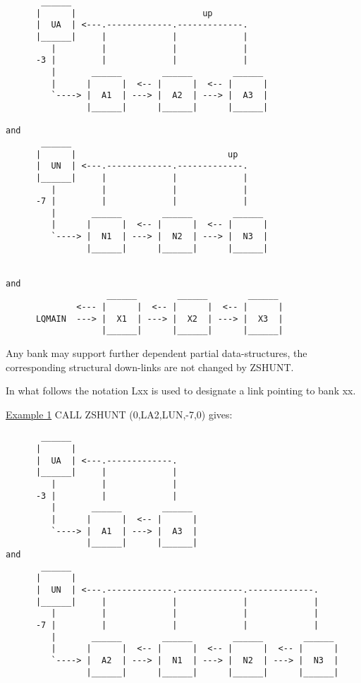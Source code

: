 \begin{verbatim}
       ______
      |      |                         up
      |  UA  | <---.-------------.-------------.
      |______|     |             |             |
         |         |             |             |
      -3 |         |             |             |
         |       ______        ______        ______
         |      |      |  <-- |      |  <-- |      |
         `----> |  A1  | ---> |  A2  | ---> |  A3  |
                |______|      |______|      |______|

and
       ______
      |      |                              up
      |  UN  | <---.-------------.-------------.
      |______|     |             |             |
         |         |             |             |
      -7 |         |             |             |
         |       ______        ______        ______
         |      |      |  <-- |      |  <-- |      |
         `----> |  N1  | ---> |  N2  | ---> |  N3  |
                |______|      |______|      |______|


and
                    ______        ______        ______
              <--- |      |  <-- |      |  <-- |      |
      LQMAIN  ---> |  X1  | ---> |  X2  | ---> |  X3  |
                   |______|      |______|      |______|
\end{verbatim} 
Any bank may support further dependent partial data-structures,
the corresponding structural down-links are not changed
by ZSHUNT.

In what follows the notation  Lxx  is used to designate
a link pointing to bank xx.

\ul{Example 1} \hspace{12mm} CALL ZSHUNT (0,LA2,LUN,-7,0)   \hspace{5mm} gives:
\begin{verbatim}
       ______
      |      |
      |  UA  | <---.-------------.
      |______|     |             |
         |         |             |
      -3 |         |             |
         |       ______        ______
         |      |      |  <-- |      |
         `----> |  A1  | ---> |  A3  |
                |______|      |______|
and
       ______
      |      |
      |  UN  | <---.-------------.-------------.-------------.
      |______|     |             |             |             |
         |         |             |             |             |
      -7 |         |             |             |             |
         |       ______        ______        ______        ______
         |      |      |  <-- |      |  <-- |      |  <-- |      |
         `----> |  A2  | ---> |  N1  | ---> |  N2  | ---> |  N3  |
                |______|      |______|      |______|      |______|
\end{verbatim} 

